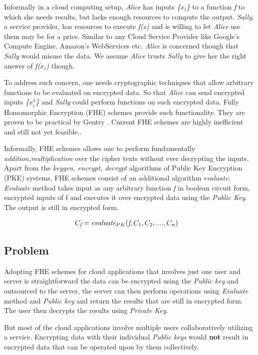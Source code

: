 \documentclass[conference]{IEEEtran}
\numberwithin{equation}{section}
\begin{document}
Informally in a cloud computing setup, \emph{Alice} has inputs \emph{\{$x_i$\}} to a function \emph{f} to which she needs results, but lacks enough resources to compute the output. \emph{Sally}, a service provider, has resources to execute \emph{f(x)} and is willing to let \emph{Alice} use them may be for a price. Similar to any Cloud Service Provider like Google's Compute Engine, Amazon's WebServices  etc. \emph{Alice} is concerned though that \emph{Sally} would misuse the data. We assume \emph{Alice} trusts \emph{Sally}  to give her the right answer of \emph{f($x_i$)} though.

To address such concern, one needs cryptographic techniques that allow arbitrary functions to be evaluated on encrypted data. So that \emph{Alice} can send encrypted inputs  \emph{\{$x^1_i$\}} and \emph{Sally} could perform functions on such encrypted data. Fully Homomorphic Encryption (FHE) schemes provide such functionality. They are proven to be practical by Gentry \cite{gentry2009fully}. Current FHE schemes are highly inefficient and still not yet feasible.\cite{vaikuntanathan2011computing}.

Informally, FHE schemes allows one to perform fundamentally \emph{addition,multiplication} over the cipher texts without ever decrypting the inputs. Apart from the \emph{keygen, encrypt, decrypt} algorithms of Public Key Encryption (PKE) systems, FHE schemes consist of an additional algorithm \emph{evaluate}. \emph{Evaluate} method takes input as any arbitrary function \emph{f} in boolean circuit form, encrypted inputs of {f} and executes it over encrypted data using the \emph{Public Key}. The output is still in encrypted form. 

\begin{align} \label{eval}
C_\emph{f}& = \emph{evaluate}_{PK}(\emph{f},C_1,C_2, ...., C_n) 
\end{align}

\subsection{Problem}
Adopting FHE schemes for cloud applications that involves just one user and server is straightforward the data can be encrypted using the \emph{Public key} and outsourced to the server, the server can then perform operations using \emph{Evaluate} method and \emph{Public key} and return the results that are still in encrypted form. The user then decrypts the results using \emph{Private Key}. 

But most of the cloud applications involve multiple users collaboratively utilizing a service.  Encrypting data with their individual \emph{Public keys} would {\bf not} result in encrypted data that can be operated upon by them collectively. 
\end{document}

